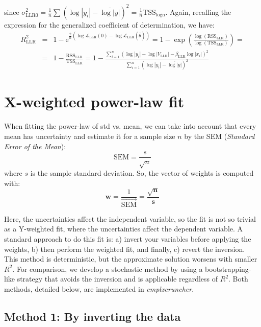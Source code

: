 \documentclass[12pt,oneside,letterpaper]{article}
\newcommand{\CC}[0]{\emph{cmplxcruncher}}
\begin{document}
since $\sigma^2_\text{LLR0}=\frac{1}{n}\sum\left(\log|y_i|-\overline{\log|y|}\right)^2=\frac{1}{n}\mathrm{TSS}_\text{logn}$. Again, recalling the expression for the generalized coefficient of determination, we have:
\begin{eqnarray*}
R^2_\text{LLR} &=& 1 - \mathrm{e}^{\frac{2}{n}\left(\log\mathcal{L}_\text{LLR}(0)-\log\mathcal{L}_\text{LLR}(\hat\theta)\right)} = 1 - \exp{\left(\frac{\log(\mathrm{RSS}_\text{LLR})}{\log(\mathrm{TSS}_\text{LLR})}\right)}
 =\\ &=& 1 - \frac{\mathrm{RSS}_\text{LLR}}{\mathrm{TSS}_\text{LLR}} =
 1 - \frac{\sum_{i=1}^n\left(\log|y_i|-\log|V_\text{LLR}|-\beta_\text{LLR}\log|x_i|\right)^2}{\sum_{i=1}^n\left(\log|y_i|-\overline{\log|y|}\right)^2}
\end{eqnarray*}


\section{X-weighted power-law fit}\label{sec:X-w}

When fitting the power-law of std vs. mean, we can take into account that every mean has uncertainty and estimate it for a sample size $n$ by the SEM (\emph{Standard Error of the Mean}):
$$ \mathrm{SEM} = \frac{s}{\sqrt{n}}$$
where $s$ is the sample standard deviation. So, the vector of weights is computed with:
$$ \mathbf{w} = \frac{1}{\overrightarrow{\mathrm{SEM}}} = \frac{\sqrt{\mathbf{n}}}{\mathbf{s}}$$

Here, the uncertainties affect the independent variable, so the fit is not so trivial as a Y-weighted fit, where the uncertainties affect the dependent variable. A standard approach to do this fit is: a) invert your variables before applying the weights, b) then perform the weighted fit, and finally, c) revert the inversion. This method is deterministic, but the approximate solution worsens with smaller $R^2$. For comparison, we develop a stochastic method by using a bootstrapping-like strategy that avoids the inversion and is applicable regardless of $R^2$. Both methods, detailed below, are implemented in \CC.

\subsection{Method 1: By inverting the data}
\end{document}
